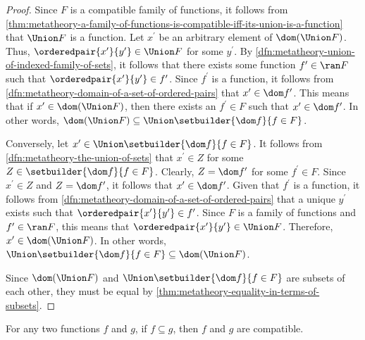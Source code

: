 \begin{proof}
    Since \( F \) is a compatible family of functions, it follows from \cref{thm:metatheory-a-family-of-functions-is-compatible-iff-its-union-is-a-function}
    that \( \Union F \) is a function.
    Let \( x^{\prime} \) be an arbitrary element of \( \dom \mleft( \Union F \mright) \).
    Thus, \( \orderedpair{x^{\prime}}{y^{\prime}} \in \Union F \) for some \( y^{\prime} \).
    By \cref{dfn:metatheory-union-of-indexed-family-of-sets}, it follows that there exists some function
    \( f^{\prime} \in \ran F \) such that \( \orderedpair{x^{\prime}}{y^{\prime}} \in f^{\prime} \).
    Since \( f^{\prime} \) is a function, it follows from \cref{dfn:metatheory-domain-of-a-set-of-ordered-pairs} that
    \( x^{\prime} \in \dom f^{\prime} \).
    This means that if \( x^{\prime} \in \dom \mleft( \Union F \mright) \), then there exists an \( f^{\prime} \in F \) such that \( x^{\prime} \in \dom f^{\prime} \).
    In other words, \( \dom \mleft( \Union F \mright) \subseteq \Union \setbuilder{\dom f}{f \in F} \).

    \vspace{0.3cm}
    \noindent
    Conversely, let \( x^{\prime} \in \Union \setbuilder{\dom f}{f \in F} \).
    It follows from \cref{dfn:metatheory-the-union-of-sets} that \( x^{\prime} \in Z \) for some \( Z \in \setbuilder{\dom f}{f \in F} \).
    Clearly, \( Z = \dom f^{\prime} \) for some \( f^{\prime} \in F \).
    Since \( x^{\prime} \in Z \) and \( Z = \dom f^{\prime} \), it follows that \( x^{\prime} \in \dom f^{\prime} \).
    Given that \( f^{\prime} \) is a function, it follows from \cref{dfn:metatheory-domain-of-a-set-of-ordered-pairs} that a
    unique \( y^{\prime} \) exists such that \( \orderedpair{x^{\prime}}{y^{\prime}} \in f^{\prime} \).
    Since \( F \) is a family of functions and \( f^{\prime} \in \ran F \), this means that \( \orderedpair{x^{\prime}}{y^{\prime}} \in \Union F \).
    Therefore, \( x^{\prime} \in \dom \mleft( \Union F \mright) \).
    In other words, \( \Union \setbuilder{\dom f}{f \in F} \subseteq \dom \mleft( \Union F \mright)  \).

    \vspace{0.3cm}
    \noindent
    Since \( \dom \mleft( \Union F \mright) \) and \( \Union \setbuilder{\dom f}{f \in F} \) are subsets of each other, they must be equal by
    \cref{thm:metatheory-equality-in-terms-of-subsets}.
\end{proof}

\begin{thm}
     \label{thm:metatheory-if-a-function-is-a-subset-of-another-function-then-the-two-functions-are-compatible}
    For any two functions \( f \) and \( g \), if \( f \subseteq g \), then \( f \) and \( g \) are compatible.
\end{thm}

